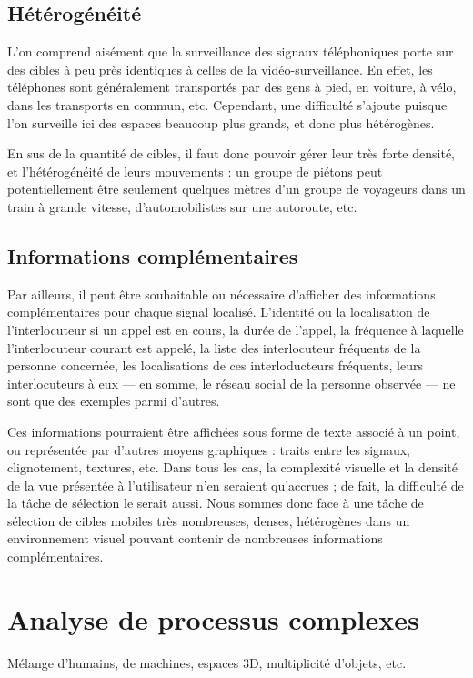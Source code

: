 	\subsection{Hétérogénéité}
	L'on comprend aisément que la surveillance des signaux téléphoniques porte sur des cibles à peu près identiques à celles de la vidéo-surveillance. En effet, les téléphones sont généralement transportés par des gens à pied, en voiture, à vélo, dans les transports en commun, etc. Cependant, une difficulté s'ajoute puisque l'on surveille ici des espaces beaucoup plus grands, et donc plus hétérogènes.
	
	En sus de la quantité de cibles, il faut donc pouvoir gérer leur très forte densité, et l'hétérogénéité de leurs mouvements : un groupe de piétons peut potentiellement être seulement quelques mètres d'un groupe de voyageurs dans un train à grande vitesse, d'automobilistes sur une autoroute, etc.
	
	\subsection{Informations complémentaires}
	Par ailleurs, il peut être souhaitable ou nécessaire d'afficher des informations complémentaires pour chaque signal localisé. L'identité ou la localisation de l'interlocuteur si un appel est en cours, la durée de l'appel, la fréquence à laquelle l'interlocuteur courant est appelé, la liste des interlocuteur fréquents de la personne concernée, les localisations de ces interloducteurs fréquents, leurs interlocuteurs à eux — en somme, le réseau social de la personne observée — ne sont que des exemples parmi d'autres.
	
	Ces informations pourraient être affichées sous forme de texte associé à un point, ou représentée par d'autres moyens graphiques : traits entre les signaux, clignotement, textures, etc. Dans tous les cas, la complexité visuelle et la densité de la vue présentée à l'utilisateur n'en seraient qu'accrues ; de fait, la difficulté de la tâche de sélection le serait aussi. Nous sommes donc face à une tâche de sélection de cibles mobiles très nombreuses, denses, hétérogènes dans un environnement visuel pouvant contenir de nombreuses informations complémentaires.
	
	\section{Analyse de processus complexes}
	Mélange d'humains, de machines, espaces 3D, multiplicité d'objets, etc.
	
